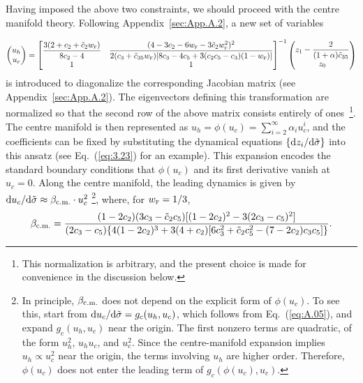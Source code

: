 \documentclass[aps,prd,twocolumn]{revtex4-2}
\newcommand\dx{{\rm d}}
\newcommand\subcm{{\rm c.m.}}
\newcommand\subF{\textsc{f}}
\begin{document}
Having imposed the above two constraints, we should proceed with the centre manifold theory. Following Appendix~\ref{sec:App.A.2}, a new set of variables
\begin{widetext}
\begin{equation}\label{eq:3.43}
  \begin{pmatrix}
    u_h \\
    u_c 
  \end{pmatrix}
  =
  \begin{bmatrix}
    \displaystyle\frac{3(2+c_2+\tilde{c}_2w_\subF)}{8c_2-4}  &  
    \displaystyle\frac{(4-3c_2-6w_\subF-3\tilde{c}_2w_\subF^2)^2}{2(c_3+\tilde{c}_{35}w_\subF)[8c_3-4c_5+3(c_2c_5-c_3)(1-w_\subF)]}  \\
    1  &  1 
  \end{bmatrix}^{-1}
  \begin{pmatrix}
    z_1 - \displaystyle\frac{2}{(1+\alpha)\tilde{c}_{35}} \\
    z_0 
  \end{pmatrix}
\end{equation}
is introduced to diagonalize the corresponding Jacobian matrix (see Appendix~\ref{sec:App.A.2}). The eigenvectors defining this transformation are normalized so that the second row of the above matrix consists entirely of ones~\footnote{This normalization is arbitrary, and the present choice is made for convenience in the discussion below.}. The centre manifold is then represented as $u_h=\phi(u_c)=\sum_{i=2}^{\infty}\alpha_i u_c^i$, and the coefficients can be fixed by substituting the dynamical equations $\{\dx z_i/\dx\tilde{\sigma}\}$ into this ansatz (see Eq.~(\ref{eq:3.23}) for an example). This expansion encodes the standard boundary conditions that $\phi(u_c)$ and its first derivative vanish at $u_c=0$. Along the centre manifold, the leading dynamics is given by $\dx u_c/\dx\tilde{\sigma}\approx\beta_\subcm\cdot u_c^2$ \footnote{In principle, $\beta_\subcm$ does not depend on the explicit form of $\phi(u_c)$. To see this, start from $\dx u_c/\dx\tilde{\sigma} = g_c(u_h,u_c)$, which follows from Eq.~(\ref{eq:A.05}), and expand $g_c(u_h,u_c)$ near the origin. The first nonzero terms are quadratic, of the form $u_h^2$, $u_h u_c$, and $u_c^2$. Since the centre-manifold expansion implies $u_h\propto u_c^2$ near the origin, the terms involving $u_h$ are higher order. Therefore, $\phi(u_c)$ does not enter the leading term of $g_c(\phi(u_c),u_c)$.}, where, for $w_\subF=1/3$, 
\begin{equation}\label{eq:3.44}
  \beta_\subcm = \frac{(1-2c_2) (3c_3-\tilde{c}_2c_5) [(1-2c_2)^2-3(2c_3-c_5)^2]}{(2c_3-c_5) \{4(1-2c_2)^3 + 3(4+c_2)[6c_3^2+\tilde{c}_2c_5^2-(7-2c_2)c_3c_5]\}}.

\end{equation}
\end{widetext}
\end{document}
